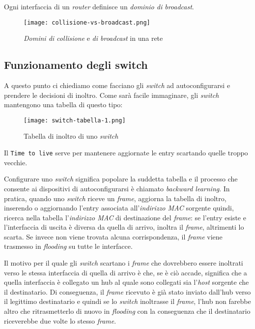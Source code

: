 \begin{note}
    Ogni interfaccia di un \emph{router} definisce un \emph{dominio di
    broadcast}.
\end{note}

\begin{figure}[ht!]
    \centering
    \texttt{[image: collisione-vs-broadcast.png]}
    \caption{\emph{Domini di collisione} e \emph{di broadcast} in una rete}
\end{figure}

\subsection{Funzionamento degli switch}
A questo punto ci chiediamo come facciano gli \emph{switch} ad autoconfigurarsi
e prendere le decisioni di inoltro. Come sarà facile immaginare, gli \emph{switch}
mantengono una tabella di questo tipo:

\begin{figure}[h!]
    \centering
    \texttt{[image: switch-tabella-1.png]}
    \caption{Tabella di inoltro di uno \emph{switch}}
\end{figure}\noindent
Il \texttt{Time to live} serve per mantenere aggiornate le entry scartando
quelle troppo vecchie.

Configurare uno \emph{switch} significa popolare la suddetta tabella e il
processo che consente ai dispositivi di autoconfigurarsi è chiamato
\emph{backward learning}. In pratica, quando uno \emph{switch} riceve un
\emph{frame}, aggiorna la tabella di inoltro, inserendo o aggiornando l'entry
associata all'\emph{indirizzo MAC} sorgente quindi, ricerca nella tabella
l'\emph{indirizzo MAC} di destinazione del \emph{frame}: se
l'entry esiste e l'interfaccia di uscita è diversa da quella di arrivo, inoltra
il \emph{frame}, altrimenti lo scarta. Se invece non viene trovata alcuna
corrispondenza, il \emph{frame} viene trasmesso in \emph{flooding} su tutte
le interfacce.

\begin{note}
    Il motivo per il quale gli \emph{switch} scartano i \emph{frame} che
    dovrebbero essere inoltrati verso le stessa interfaccia di quella di arrivo
    è che, se è ciò accade, significa che a quella interfaccia è collegato un
    hub al quale sono collegati sia l'\emph{host} sorgente che il destinatario.
    Di conseguenza, il \emph{frame} ricevuto è già stato inviato dall'hub
    verso il legittimo destinatario e quindi se lo \emph{switch} inoltrasse il
    \emph{frame}, l'hub non farebbe altro che ritrasmetterlo di nuovo in
    \emph{flooding} con la conseguenza che il destinatario riceverebbe due volte
    lo stesso \emph{frame}.
\end{note}

